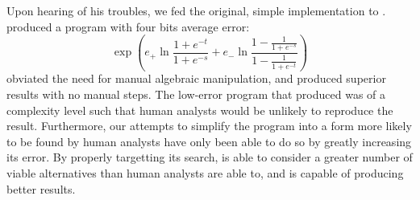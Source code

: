 \documentclass[paper.tex]{subfiles}
\begin{document}
Upon hearing of his troubles,
  we fed the original, simple implementation to \casio.
\casio produced a program with four bits average error:
  \begin{equation*}
  \operatorname{exp}\left(e_+\ln{\frac{1+e^{-t}}{1+e^{-s}}} +
     e_-\ln{\frac{1-\frac{1}{1+e^{-s}}}
                 {1-\frac{1}{1+e^{-t}}}}\right)
  \end{equation*}
\casio obviated the need for manual algebraic manipulation,
  and produced superior results with no manual steps.
The low-error program that \casio produced was of a complexity level
  such that human analysts would be unlikely to reproduce the result. 
Furthermore, our attempts to simplify the program
  into a form more likely to be found by human analysts
  have only been able to do so by greatly increasing its error.
By properly targetting its search,
  \casio is able to consider a greater number of viable alternatives
  than human analysts are able to,
  and is capable of producing better results.

\end{document}
